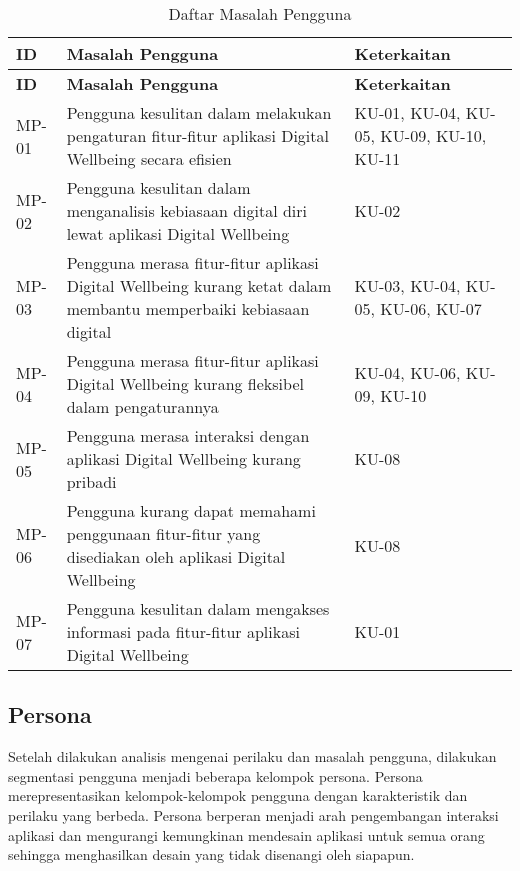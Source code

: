 \RaggedLeft
\begin{small}
\begin{longtable}[c]{|W{c}{0.08\textwidth}|>{\ccnormspacing}m{0.6\textwidth}|>{\ccnormspacingcenter}m{0.2\textwidth}|}
  \caption{Daftar Masalah Pengguna}
  \label{tab:daftar_masalah} \\
  \hline {}
  \textbf{ID} & \centering\textbf{Masalah Pengguna} & \textbf{Keterkaitan} \\ \hline \endfirsthead
  \hline {}
  \textbf{ID} & \centering\textbf{Masalah Pengguna} & \textbf{Keterkaitan} \\ \hline \endhead

  \hline \endfoot

  MP-01  & Pengguna kesulitan dalam melakukan pengaturan fitur-fitur aplikasi Digital Wellbeing secara efisien & KU-01, KU-04, KU-05, KU-09, KU-10, KU-11 \\ \hline
  MP-02  & Pengguna kesulitan dalam menganalisis kebiasaan digital diri lewat aplikasi Digital Wellbeing & KU-02 \\ \hline
  MP-03  & Pengguna merasa fitur-fitur aplikasi Digital Wellbeing kurang ketat dalam membantu memperbaiki kebiasaan digital & KU-03, KU-04, KU-05, KU-06, KU-07 \\ \hline
  MP-04  & Pengguna merasa fitur-fitur aplikasi Digital Wellbeing kurang fleksibel dalam pengaturannya & KU-04, KU-06, KU-09, KU-10 \\ \hline
  MP-05  & Pengguna merasa interaksi dengan aplikasi Digital Wellbeing kurang pribadi & KU-08 \\ \hline
  MP-06  & Pengguna kurang dapat memahami penggunaan fitur-fitur yang disediakan oleh aplikasi Digital Wellbeing & KU-08 \\ \hline
  MP-07  & Pengguna kesulitan dalam mengakses informasi pada fitur-fitur aplikasi Digital Wellbeing & KU-01 \\ \hline
\end{longtable}
\end{small}
\justifying
\FloatBarrier



\subsection{Persona}
\label{subsec:persona_pengguna}
Setelah dilakukan analisis mengenai perilaku dan masalah pengguna, dilakukan segmentasi pengguna menjadi beberapa kelompok persona. Persona merepresentasikan kelompok-kelompok pengguna dengan karakteristik dan perilaku yang berbeda. Persona berperan menjadi arah pengembangan interaksi aplikasi dan mengurangi kemungkinan mendesain aplikasi untuk semua orang sehingga menghasilkan desain yang tidak disenangi oleh siapapun. \parencite{cooper2014face}

